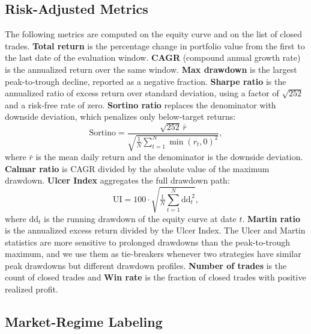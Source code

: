 \documentclass{ieeeaccess}
\begin{document}
\subsection{Risk-Adjusted Metrics}
\label{subsec:metrics}

The following metrics are computed on the equity curve and on the list of closed trades. \textbf{Total return} is the percentage change in portfolio value from the first to the last date of the evaluation window. \textbf{CAGR} (compound annual growth rate) is the annualized return over the same window. \textbf{Max drawdown} is the largest peak-to-trough decline, reported as a negative fraction. \textbf{Sharpe ratio} \cite{sharpe1966} is the annualized ratio of excess return over standard deviation, using a factor of $\sqrt{252}$ and a risk-free rate of zero. \textbf{Sortino ratio} \cite{sortino1994} replaces the denominator with downside deviation, which penalizes only below-target returns:
\begin{equation}
\mathrm{Sortino} = \frac{\sqrt{252}\,\bar{r}}{\sqrt{\tfrac{1}{N}\sum_{t=1}^{N}\min(r_t, 0)^2}},
\label{eq:sortino}
\end{equation}
where $\bar{r}$ is the mean daily return and the denominator is the downside deviation. \textbf{Calmar ratio} \cite{young1991} is CAGR divided by the absolute value of the maximum drawdown. \textbf{Ulcer Index} \cite{martin1989} aggregates the full drawdown path:
\begin{equation}
\mathrm{UI} = 100 \cdot \sqrt{\tfrac{1}{N}\sum_{t=1}^{N} \mathrm{dd}_t^{\,2}},
\label{eq:ulcer}
\end{equation}
where $\mathrm{dd}_t$ is the running drawdown of the equity curve at date $t$. \textbf{Martin ratio} \cite{martin1989} is the annualized excess return divided by the Ulcer Index. The Ulcer and Martin statistics are more sensitive to prolonged drawdowns than the peak-to-trough maximum, and we use them as tie-breakers whenever two strategies have similar peak drawdowns but different drawdown profiles. \textbf{Number of trades} is the count of closed trades and \textbf{Win rate} is the fraction of closed trades with positive realized profit.

\subsection{Market-Regime Labeling}
\label{subsec:regimes}
\end{document}

